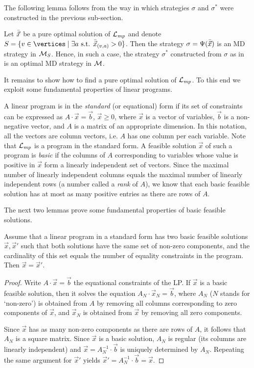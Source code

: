 \noindent
The following lemma follows from the way in which strategies $\sigma$ and $\sigma^*$ were constructed in the previous sub-section.

\begin{lemma}
	\label{5-lem:pure-lpsol}
Let $\bar{\vec{x}}$ be a pure optimal solution of $\mathcal{L}_{\mathit{mp}}$ and denote $ S = \{v \in \vertices\mid \exists a \text{ s.t. }\lpsol{x}_{(v,a)}>0\} $. Then the strategy $\sigma=\Psi(\bar{\vec{x}})$ is an MD strategy in $\mathcal{M}_{S}$. Hence, in such a case, the strategy $\sigma^*$ constructed from $ \sigma $ as in  is an optimal MD strategy in $\mathcal{M}$.
\end{lemma}

It remains to show how to find a pure optimal solution of $\mathcal{L}_{\mathit{mp}}$. To this end we exploit some fundamental properties of linear programs.

A linear program is in the \emph{standard} (or equational) form if its set of constraints can be expressed as $A\cdot \vec{x} = \vec{b}$, $\vec{x}\geq 0$, where $\vec{x}$ is a vector of variables, $\vec{b}$ is a non-negative vector, and $A$ is a matrix of an appropriate dimension. In this notation, all the vectors are column vectors, i.e. $A$ has one column per each variable. Note that $\mathcal{L}_{\mathit{mp}}$ is a program in the standard form. A feasible solution $\vec{x}$ of such a program is \emph{basic} if the columns of $A$ corresponding to variables whose value is positive in $\vec{x}$ form a linearly independent set of vectors. Since the maximal number of linearly independent columns equals the maximal number of linearly independent rows (a number called a \emph{rank} of $A$), we know that each basic feasible solution has at most as many positive entries as there are rows of $A$. 

The next two lemmas prove some fundamental properties of basic feasible solutions.

\begin{lemma}
\label{5-lem:basic-cond-unique}
Assume that a linear program in a standard form has two basic feasible solutions $\vec{x},\vec{x}'$ such that both solutions have the same set of non-zero components, and the cardinality of this set equals the number of equality constraints in the program. Then $\vec{x}=\vec{x}'$.
\end{lemma}
\begin{proof}
Write $A\cdot \vec{x} = \vec{b}$ the equational constraints of the LP.
If $\vec{x}$ is a basic feasible solution, then it solves the equation $A_{N} \cdot \vec{x}_N = \vec{b}$, where $A_N$ ($  N$ stands for `non-zero') is obtained from $A$ by removing all columns corresponding to zero components of $\vec{x}$, and   $\vec{x}_N$ is obtained from $\vec{x}$ by removing all zero components. 

Since $\vec{x}$ has as many non-zero components as there are rows of $A$, it follows that $A_N$ is a square matrix. Since $\vec{x}$ is a basic solution, $A_N$ is regular (its columns are linearly independent) and $\vec{x}=A_{N}^{-1}\cdot \vec{b}$ is uniquely determined by $A_N$. Repeating the same argument for $\vec{x}'$ yields $\vec{x}'=A_{N}^{-1}\cdot \vec{b}= \vec{x}$.
\end{proof}

